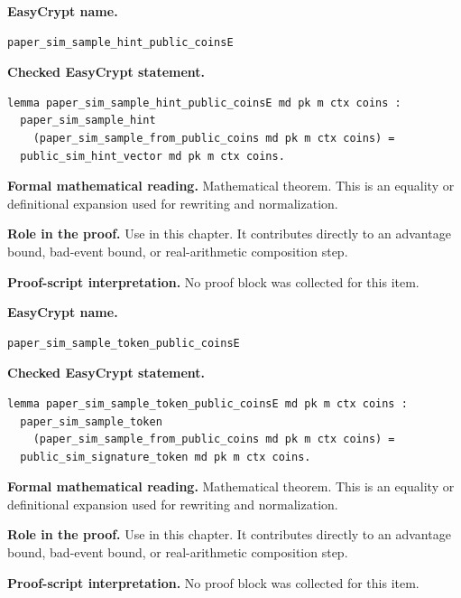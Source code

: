 \begin{formaltheorem}
\noindent\textbf{EasyCrypt name.}
\begin{lstlisting}[language=EasyCrypt,basicstyle=\ttfamily\scriptsize]
paper_sim_sample_hint_public_coinsE
\end{lstlisting}
\noindent\textbf{Checked EasyCrypt statement.}
\begin{lstlisting}[language=EasyCrypt,basicstyle=\ttfamily\scriptsize]
lemma paper_sim_sample_hint_public_coinsE md pk m ctx coins :
  paper_sim_sample_hint
    (paper_sim_sample_from_public_coins md pk m ctx coins) =
  public_sim_hint_vector md pk m ctx coins.
\end{lstlisting}
\noindent\textbf{Formal mathematical reading.}
Mathematical theorem. This is an equality or definitional expansion used for rewriting and normalization.

\noindent\textbf{Role in the proof.}
Use in this chapter. It contributes directly to an advantage bound, bad-event bound, or real-arithmetic composition step.

\noindent\textbf{Proof-script interpretation.}
No proof block was collected for this item.

\end{formaltheorem}

\begin{formaltheorem}
\noindent\textbf{EasyCrypt name.}
\begin{lstlisting}[language=EasyCrypt,basicstyle=\ttfamily\scriptsize]
paper_sim_sample_token_public_coinsE
\end{lstlisting}
\noindent\textbf{Checked EasyCrypt statement.}
\begin{lstlisting}[language=EasyCrypt,basicstyle=\ttfamily\scriptsize]
lemma paper_sim_sample_token_public_coinsE md pk m ctx coins :
  paper_sim_sample_token
    (paper_sim_sample_from_public_coins md pk m ctx coins) =
  public_sim_signature_token md pk m ctx coins.
\end{lstlisting}
\noindent\textbf{Formal mathematical reading.}
Mathematical theorem. This is an equality or definitional expansion used for rewriting and normalization.

\noindent\textbf{Role in the proof.}
Use in this chapter. It contributes directly to an advantage bound, bad-event bound, or real-arithmetic composition step.

\noindent\textbf{Proof-script interpretation.}
No proof block was collected for this item.

\end{formaltheorem}

